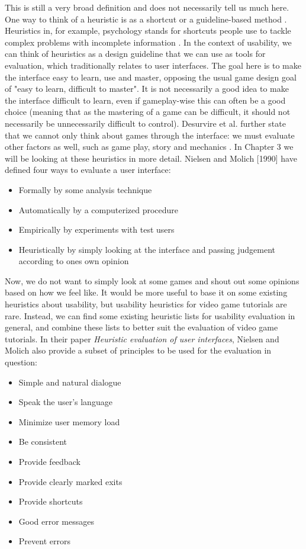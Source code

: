 This is still a very broad definition and does not necessarily tell us much here. One way to think of a heuristic is as a shortcut or a guideline-based method \cite{Isbister2008}. Heuristics in, for example, psychology stands for shortcuts people use to tackle complex problems with incomplete information \cite{Kahneman1982}. In the context of usability, we can think of heuristics as a design guideline that we can use as tools for evaluation, which traditionally relates to user interfaces. The goal here is to make the interface easy to learn, use and master, opposing the usual game design goal of "easy to learn, difficult to master". \cite{Desurvire2004} It is not necessarily a good idea to make the interface difficult to learn, even if gameplay-wise this can often be a good choice (meaning that as the mastering of a game can be difficult, it should not necessarily be unnecessarily difficult to control). Desurvire et al. further state that we cannot only think about games through the interface: we must evaluate other factors as well, such as game play, story and mechanics \cite{Desurvire2004}. In Chapter 3 we will be looking at these heuristics in more detail. Nielsen and Molich [1990] have defined four ways to evaluate a user interface: 

\begin{itemize}
\item Formally by some analysis technique
\item Automatically by a computerized procedure
\item Empirically by experiments with test users 
\item Heuristically by simply looking at the interface and passing judgement according to ones own opinion
\end{itemize}

Now, we do not want to simply look at some games and shout out some opinions based on how we feel like. It would be more useful to base it on some existing heuristics about usability, but usability heuristics for video game tutorials are rare. Instead, we can find some existing heuristic lists for usability evaluation in general, and combine these lists to better suit the evaluation of video game tutorials. In their paper \textit{Heuristic evaluation of user interfaces}, Nielsen and Molich also provide a subset of principles to be used for the evaluation in question: \cite{Nielsen1990}

\begin{itemize}
	\item Simple and natural dialogue
	\item Speak the user's language
	\item Minimize user memory load
	\item Be consistent
	\item Provide feedback
	\item Provide clearly marked exits
	\item Provide shortcuts
	\item Good error messages
	\item Prevent errors
\end{itemize}

